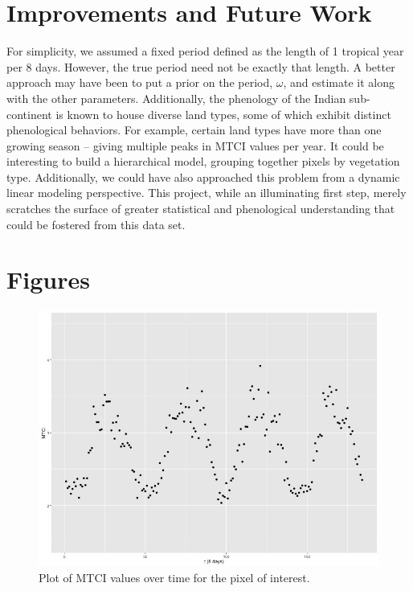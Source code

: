 \documentclass[12pt, a4paper]{article}
\begin{document}
\section{Improvements and Future Work}
\qquad For simplicity, we assumed a fixed period defined as the length of 1 tropical year per 8 days. However, the true period need not be exactly that length. A better approach may have been to put a prior on the period, $\omega$, and estimate it along with the other parameters. Additionally, the phenology of the Indian sub-continent is known to house diverse land types, some of which exhibit distinct phenological behaviors. For example, certain land types have more than one growing season -- giving multiple peaks in MTCI values per year. It could be interesting to build a hierarchical model, grouping together pixels by vegetation type. Additionally, we could have also approached this problem from a dynamic linear modeling perspective. This project, while an illuminating first step, merely scratches the surface of greater statistical and phenological understanding that could be fostered from this data set.  

\section{Figures}
\begin{figure}[H]
\centering
\includegraphics[width=0.7\linewidth]{projectfig0.jpeg}
\caption{\small Plot of MTCI values over time for the pixel of interest.}
\end{figure}
\end{document}
